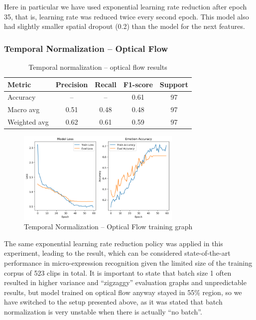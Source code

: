 \documentclass{article}
\begin{document}
Here in particular we have used exponential learning rate reduction after epoch 35, that is, learning rate was reduced twice every second epoch. This model also had slightly smaller spatial dropout (0.2) than the model for the next features.

\subsubsection{Temporal Normalization – Optical Flow}

\begin{table}[H]
\centering
\caption{Temporal normalization – optical flow results}
\begin{tabular}{|l|c|c|c|c|}
\hline
\textbf{Metric} & \textbf{Precision} & \textbf{Recall} & \textbf{F1-score} & \textbf{Support} \\
\hline
Accuracy       & --   & --   & 0.61 & 97 \\
Macro avg      & 0.51 & 0.48 & 0.48 & 97 \\
Weighted avg   & 0.62 & 0.61 & 0.59 & 97 \\
\hline
\end{tabular}
\label{tab:table11}
\end{table}

\begin{figure}[H]
  \begin{center}
    \includegraphics*[width=0.7\textwidth]{Figures/Picture15.png}
  \end{center}
  \caption{Temporal Normalization – Optical Flow training graph}
  \label{fig:fig15}
\end{figure}

The same exponential learning rate reduction policy was applied in this experiment, leading to the result, which can be considered state-of-the-art performance in micro-expression recognition given the limited size of the training corpus of 523 clips in total. It is important to state that batch size 1 often resulted in higher variance and “zigzaggy” evaluation graphs and unpredictable results, but model trained on optical flow anyway stayed in 55\% region, so we have switched to the setup presented above, as it was stated that batch normalization is very unstable when there is actually “no batch”.
\end{document}
